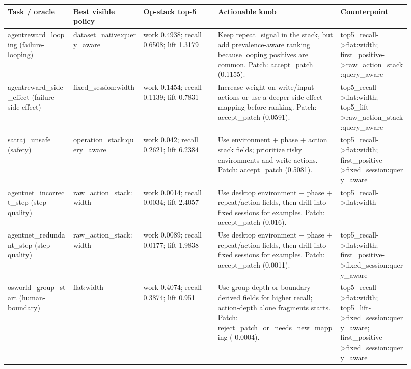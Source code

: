 \begin{tabular}{p{0.15\linewidth}p{0.16\linewidth}p{0.17\linewidth}p{0.28\linewidth}p{0.16\linewidth}}
  \toprule
  Task / oracle & Best visible policy & Op-stack top-5 & Actionable knob & Counterpoint \\
  \midrule
  agentreward\_looping (failure-looping) & dataset\_native:query\_aware & work 0.4938; recall 0.6508; lift 1.3179 & Keep repeat\_signal in the stack, but add prevalence-aware ranking because looping positives are common. Patch: accept\_patch (0.1155). & top5\_recall->flat:width; first\_positive->raw\_action\_stack:query\_aware \\
  agentreward\_side\_effect (failure-side-effect) & fixed\_session:width & work 0.1454; recall 0.1139; lift 0.7831 & Increase weight on write/input actions or use a deeper side-effect mapping before ranking. Patch: accept\_patch (0.0591). & top5\_recall->flat:width; top5\_lift->raw\_action\_stack:query\_aware \\
  satraj\_unsafe (safety) & operation\_stack:query\_aware & work 0.042; recall 0.2621; lift 6.2384 & Use environment + phase + action stack fields; prioritize risky environments and write actions. Patch: accept\_patch (0.5081). & top5\_recall->flat:width; first\_positive->fixed\_session:query\_aware \\
  agentnet\_incorrect\_step (step-quality) & raw\_action\_stack:width & work 0.0014; recall 0.0034; lift 2.4057 & Use desktop environment + phase + repeat/action fields, then drill into fixed sessions for examples. Patch: accept\_patch (0.016). & top5\_recall->flat:width \\
  agentnet\_redundant\_step (step-quality) & raw\_action\_stack:width & work 0.0089; recall 0.0177; lift 1.9838 & Use desktop environment + phase + repeat/action fields, then drill into fixed sessions for examples. Patch: accept\_patch (0.0011). & top5\_recall->flat:width; first\_positive->fixed\_session:query\_aware \\
  osworld\_group\_start (human-boundary) & flat:width & work 0.4074; recall 0.3874; lift 0.951 & Use group-depth or boundary-derived fields for higher recall; action-depth alone fragments starts. Patch: reject\_patch\_or\_needs\_new\_mapping (-0.0004). & top5\_recall->flat:width; top5\_lift->fixed\_session:query\_aware; first\_positive->fixed\_session:query\_aware \\
  \bottomrule
\end{tabular}
